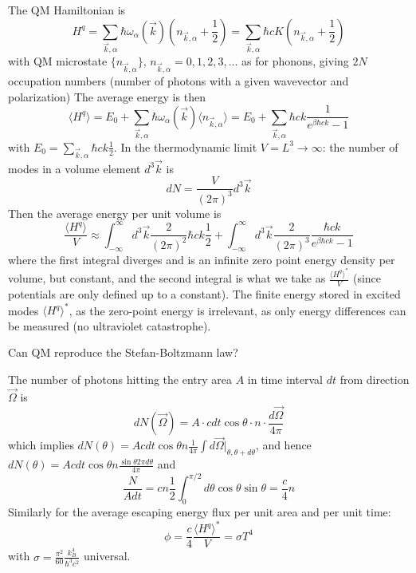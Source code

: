 \documentclass[12pt, a4paper, oneside, openright, titlepage]{book}
\begin{document}
The QM Hamiltonian is \begin{equation*}
    H^q = \sum_{\vec{k},\alpha}\hbar\omega_{\alpha}(\vec{k})(n_{\vec{k},\alpha} + \frac{1}{2}) = \sum_{\vec{k},\alpha}\hbar cK(n_{\vec{k},\alpha}+\frac{1}{2})
\end{equation*}
with QM microstate $\{n_{\vec{k},\alpha}\}$, $n_{\vec{k},\alpha} = 0,1,2,3,...$ as for phonons, giving $2N$ occupation numbers (number of photons with a given wavevector and polarization)
The average energy is then \begin{equation*}
    \langle H^q \rangle = E_0+\sum_{\vec{k},\alpha}\hbar\omega_{\alpha}(\vec{k}) \langle n_{\vec{k},\alpha}\rangle = E_0+\sum_{\vec{k},\alpha}\hbar ck\frac{1}{e^{\beta\hbar ck}-1}
\end{equation*}
with $E_0 = \sum_{\vec{k},\alpha}\hbar ck\frac{1}{2}$. In the thermodynamic limit $V = L^3 \rightarrow \infty$: the number of modes in a volume element $d^3\vec{k}$ is \begin{equation*}
    dN = \frac{V}{(2\pi)^3}d^3\vec{k}
\end{equation*}
Then the average energy per unit volume is \begin{equation*}
    \frac{\langle H^q\rangle}{V} \approx \int_{-\infty}^{\infty}d^3\vec{k}\frac{2}{(2\pi)^2}\hbar ck\frac{1}{2}+\int_{-\infty}^{\infty}d^3\vec{k}\frac{2}{(2\pi)^3}\frac{\hbar ck}{e^{\beta \hbar ck}-1}
\end{equation*}
where the first integral diverges and is an infinite zero point energy density per volume, but constant, and the second integral is what we take as $\frac{\langle H^q\rangle^*}{V}$ (since potentials are only defined up to a constant). The finite energy stored in excited modes $\langle H^q\rangle^*$, as the zero-point energy is irrelevant, as only energy differences can be measured (no ultraviolet catastrophe).

\begin{qst}
    Can QM reproduce the Stefan-Boltzmann law?
\end{qst}

The number of photons hitting the entry area $A$ in time interval $dt$ from direction $\vec{\Omega}$ is \begin{equation*}
    dN(\vec{\Omega}) = A\cdot cdt\cos\theta \cdot n\cdot \frac{d\vec{\Omega}}{4\pi}
\end{equation*}
which implies $dN(\theta) = Acdt\cos\theta n\frac{1}{4\pi}\int d\vec{\Omega}\Bigg\rvert_{\theta,\theta+d\theta}$, and hence $dN(\theta) = Acdt\cos\theta n \frac{\sin\theta 2\pi d\theta}{4\pi}$ and \begin{equation*}
    \frac{N}{Adt} = cn\frac{1}{2}\int_0^{\pi/2}d\theta\cos\theta\sin\theta = \frac{c}{4}n
\end{equation*}
Similarly for the average escaping energy flux per unit area and per unit time: \begin{equation*}
    \phi = \frac{c}{4}\frac{\langle H^q\rangle^*}{V} = \sigma T^4
\end{equation*}
with $\sigma = \frac{\pi^2}{60}\frac{k_B^4}{\hbar^3c^2}$ universal.
\end{document}
